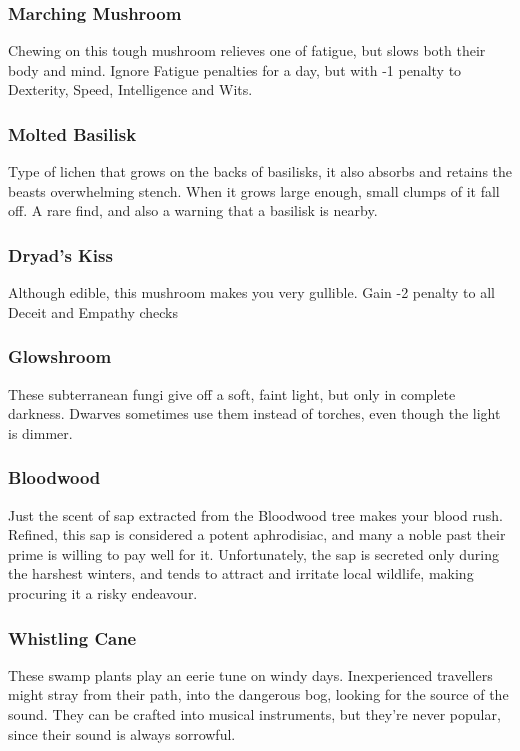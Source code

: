 \begin{multicols}{2}
\subsubsection{Marching Mushroom}

Chewing on this tough mushroom relieves one of fatigue, but slows both their body and mind. Ignore Fatigue penalties for a day, but 
with -1 penalty to Dexterity, Speed, Intelligence and Wits.

\subsubsection{Molted Basilisk}

Type of lichen that grows on the backs of basilisks, it also absorbs and retains the beasts overwhelming stench. When it grows large 
enough, small clumps of it fall off. A rare find, and also a warning that a basilisk is nearby.

\subsubsection{Dryad's Kiss}

Although edible, this mushroom makes you very gullible. Gain -2 penalty to all Deceit and Empathy checks

\subsubsection{Glowshroom}

These subterranean fungi give off a soft, faint light, but only in complete darkness. Dwarves sometimes use them instead of torches, 
even though the light is dimmer.

\subsubsection{Bloodwood}

Just the scent of sap extracted from the Bloodwood tree makes your blood rush. Refined, this sap is considered a potent aphrodisiac, 
and many a noble past their prime is willing to pay well for it. Unfortunately, the sap is secreted only during the harshest winters, 
and tends to attract and irritate local wildlife, making procuring it a risky endeavour.

\subsubsection{Whistling Cane}

These swamp plants play an eerie tune on windy days. Inexperienced travellers might stray from their path, into the dangerous bog, 
looking for the source of the sound. They can be crafted into musical instruments, but they're never popular, since their sound is 
always sorrowful.

\end{multicols}
